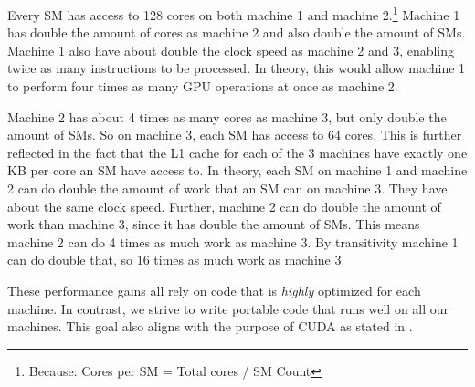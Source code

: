 Every SM has access to 128 cores on both machine 1 and machine 2.\footnote{Because: Cores per SM = Total cores / SM Count} Machine 1 has double the amount of cores as machine 2 and also double the amount of SMs. Machine 1 also have about double the clock speed as machine 2 and 3, enabling twice as many instructions to be processed. In theory, this would allow machine 1 to perform four times as many GPU operations at once as machine 2.

Machine 2 has about 4 times as many cores as machine 3, but only double the amount of SMs. So on machine 3, each SM has access to 64 cores. This is further reflected in the fact that the L1 cache for each of the 3 machines have exactly one KB per core an SM have access to. In theory, each SM on machine 1 and machine 2 can do double the amount of work that an SM can on machine 3. They have about the same clock speed. Further, machine 2 can do double the amount of work than machine 3, since it has double the amount of SMs. This means machine 2 can do 4 times as much work as machine 3. By transitivity machine 1 can do double that, so 16 times as much work as machine 3.

These performance gains all rely on code that is \textit{highly} optimized for each machine. In contrast, we strive to write portable code that runs well on all our machines. This goal also aligns with the purpose of CUDA as stated in \cite[Section 1.3]{nvidia:cudadoc}.